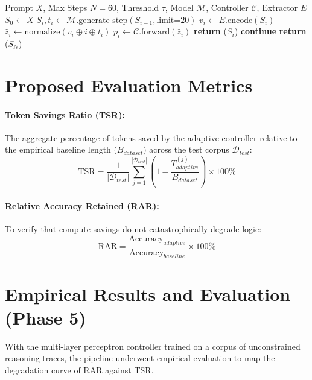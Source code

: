 \documentclass[11pt]{article}
\begin{document}
\begin{algorithm}[H]
\caption{Adaptive Early Exit Generation Loop}
\label{alg:early_exit}
\begin{algorithmic}[1]
\REQUIRE Prompt $X$, Max Steps $N=60$, Threshold $\tau$, Model $\mathcal{M}$, Controller $\mathcal{C}$, Extractor $E$
\STATE $S_0 \leftarrow X$
    \STATE $S_i, t_i \leftarrow \mathcal{M}.\text{generate\_step}(S_{i-1}, \text{limit=20})$
    \STATE $v_i \leftarrow E.\text{encode}(S_i)$
    \STATE $\hat{z}_i \leftarrow \text{normalize}(v_i \oplus i \oplus t_i)$
    \STATE $p_i \leftarrow \mathcal{C}.\text{forward}(\hat{z}_i)$
            \STATE \textbf{return} ($S_i$)
        \ELSE
            \STATE \textbf{continue} 
        \ENDIF
    \ENDIF
\ENDFOR
\STATE \textbf{return} ($S_N$) 
\end{algorithmic}
\end{algorithm}

\section{Proposed Evaluation Metrics}
\paragraph{Token Savings Ratio (TSR):} The aggregate percentage of tokens saved by the adaptive controller relative to the empirical baseline length ($B_{dataset}$) across the test corpus $\mathcal{D}_{test}$:
\begin{equation}
    \text{TSR} = \frac{1}{|\mathcal{D}_{test}|} \sum_{j=1}^{|\mathcal{D}_{test}|} \left( 1 - \frac{T_{adaptive}^{(j)}}{B_{dataset}} \right) \times 100\%
\end{equation}

\paragraph{Relative Accuracy Retained (RAR):} To verify that compute savings do not catastrophically degrade logic:
\begin{equation}
    \text{RAR} = \frac{\text{Accuracy}_{adaptive}}{\text{Accuracy}_{baseline}} \times 100\%
\end{equation}

\section{Empirical Results and Evaluation (Phase 5)}
With the multi-layer perceptron controller trained on a corpus of unconstrained reasoning traces, the pipeline underwent empirical evaluation to map the degradation curve of RAR against TSR.
\end{document}
